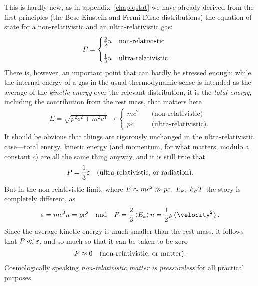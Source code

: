 This is hardly new, as in appendix~\ref{chap:qstat} we have already derived from
the first principles (the Bose-Einstein and Fermi-Dirac distributions) the equation
of state for a non-relativistic and an ultra-relativistic gas:
\begin{align*}
  P =
  \begin{cases}
    \frac{2}{3}u \quad\text{non-relativistic}\\[10pt]
    \frac{1}{3}u \quad\text{ultra-relativistic}.
  \end{cases}
\end{align*}
There is, however, an important point that can hardly be stressed enough: while
the internal energy of a gas in the usual thermodynamic sense is intended as the
average of the \emph{kinetic energy} over the relevant distribution, it is the
\emph{total energy}, including the contribution from
the rest mass, that matters here
\begin{align*}
 E = \sqrt{p^2 c^2 + m^2 c^4} \rightarrow
 \begin{cases}
   mc^2 \quad & \text{(non-relativistic)}\\
   pc \quad & \text{(ultra-relativistic)}.
 \end{cases}
\end{align*}
It should be obvious that things are rigorously unchanged in the ultra-relativistic
case---total energy, kinetic energy (and momentum, for what matters, modulo a constant
$c$) are all the same thing anyway, and it is still true that
\begin{align}
  P = \frac{1}{3} \varepsilon \quad \text{(ultra-relativistic, or radiation)}.
\end{align}
But in the non-relativistic limit, where $E \approx mc^2 \gg pc,~E_k,~k_B T$ the story
is completely different, as
\begin{align*}
  \edensity = mc^2 n = \density c^2
  \quad \text{and} \quad
  \pressure = \frac{2}{3} \ave{E_k} n = \frac{1}{2} \density \ave{\velocity^2}.
\end{align*}
Since the average kinetic energy is much smaller than the rest mass, it follows that
$P \ll \varepsilon$, and so much so that it can be taken to be zero
\begin{align}
  P \approx 0 \quad \text{(non-relativistic, or matter)}.
\end{align}
Cosmologically speaking \emph{non-relativistic matter is pressureless} for all
practical purposes.

